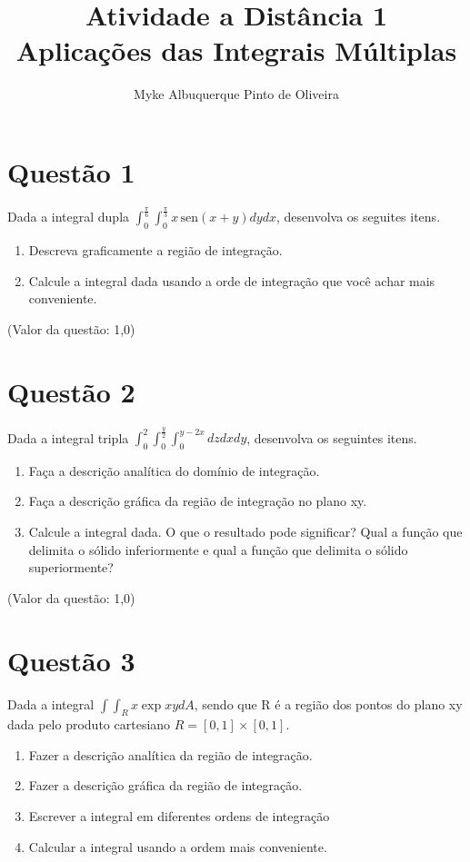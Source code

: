 \documentclass[10pt,a4paper]{article}
\author{Myke Albuquerque Pinto de Oliveira}
\title{\Huge Atividade a Distância 1 \\ 
	Aplicações das Integrais Múltiplas}
\newcommand{\sen}{\hspace{2pt}\textrm{sen}}
\begin{document}
	\maketitle
	\newpage
	\section{Questão 1}
	
	Dada a integral dupla $ \int_{0}^{\frac{\pi}{6}} \int_{0}^{\frac{\pi}{3}} x \sen (x + y) dy dx $, desenvolva os seguites itens.
	
	\begin{enumerate}
		\item Descreva graficamente a região de integração.
		\item Calcule a integral dada usando a orde de integração que você achar mais conveniente.
	\end{enumerate}
	
	(Valor da questão: 1,0)
	
	\section{Questão 2}
	
	Dada a integral tripla $ \int_{0}^{2} \int_{0}^{\frac{y}{2}} \int_{0}^{y-2x} dz dx dy $, desenvolva os seguintes itens.
	
	\begin{enumerate}
		\item Faça a descrição analítica do domínio de integração.
		\item Faça a descrição gráfica da região de integração no plano xy.
		\item Calcule a integral dada. O que o resultado pode significar?
		\integral Qual a função que delimita o sólido inferiormente e qual a função que delimita o sólido superiormente?
	\end{enumerate}
	
	(Valor da questão: 1,0)
	
	\section{Questão 3}
	
	Dada a integral $ \int \int_R x \exp{xy} dA $, sendo que R é a região dos pontos do plano xy dada pelo produto cartesiano $ R=[0, 1] \times [0, 1] $.
	
	\begin{enumerate}
		\item Fazer a descrição analítica da região de integração.
		\item Fazer a descrição gráfica da região de integração.
		\item Escrever a integral em diferentes ordens de integração
		\item Calcular a integral usando a ordem mais conveniente.
	\end{enumerate}
\end{document}
